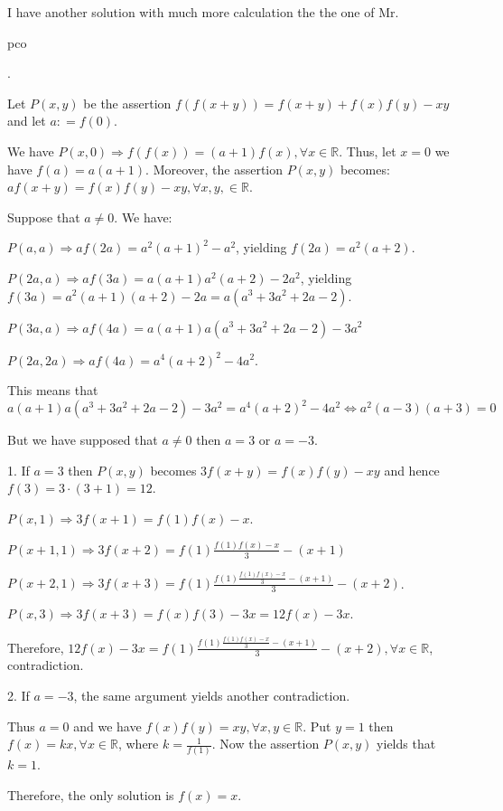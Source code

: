 \begin{solution}
	I have another solution with much more calculation the the one of Mr.\begin{bolded}pco\end{bolded}.

Let $ P(x,y)$ be the assertion $ f(f(x+y)) = f(x+y) + f(x)f(y) - xy$ and let $ a: =f(0)$.

We have $ P(x,0) \Rightarrow f(f(x)) = (a+1)f(x),\forall x\in\mathbb{R}$. Thus, let $ x=0$ we have $ f(a) = a(a+1)$. Moreover, the assertion $ P(x,y)$ becomes: $ af(x+y) = f(x)f(y) - xy,\forall x,y,\in\mathbb{R}$.

Suppose that $ a\neq 0$. We have:

$ P(a,a) \Rightarrow af(2a) = a^2(a+1)^2 - a^2$, yielding $ f(2a) = a^2(a+2)$.

$ P(2a,a) \Rightarrow af(3a) = a(a+1)a^2(a+2) - 2a^2$, yielding $ f(3a) = a^2(a+1)(a+2) - 2a = a(a^3 + 3a^2 + 2a -2)$.

$ P(3a,a) \Rightarrow af(4a) = a(a+1)a(a^3 + 3a^2 + 2a -2) - 3a^2$

$ P(2a,2a) \Rightarrow af(4a) = a^4(a+2)^2 - 4a^2$.

This means that $ a(a+1)a(a^3 + 3a^2 + 2a -2) - 3a^2 = a^4(a+2)^2 - 4a^2\Leftrightarrow a^2(a-3)(a+3) = 0$

But we have supposed that $ a\neq 0$ then $ a=3$ or $ a=-3$.

1. If $ a=3$ then $ P(x,y)$ becomes $ 3f(x+y) = f(x)f(y) - xy$ and hence $ f(3) = 3\cdot (3+1) = 12$.

$ P(x,1) \Rightarrow 3f(x+1) = f(1)f(x) - x$.

$ P(x+1,1) \Rightarrow 3f(x+2) = f(1)\frac{f(1)f(x) - x}{3} - (x+1)$

$ P(x+2,1) \Rightarrow 3f(x+3) = f(1)\frac{f(1)\frac{f(1)f(x) - x}{3} - (x+1)}{3} - (x+2)$.

$ P(x,3) \Rightarrow 3f(x+3) = f(x)f(3) - 3x = 12f(x) - 3x$.

Therefore, $ 12f(x) - 3x = f(1)\frac{f(1)\frac{f(1)f(x) - x}{3} - (x+1)}{3} - (x+2),\forall x\in\mathbb{R}$, contradiction.

2. If $ a= -3$, the same argument yields another contradiction.

Thus $ a=0$ and we have $ f(x)f(y) = xy,\forall x,y\in\mathbb{R}$. Put $ y=1$ then $ f(x) = kx,\forall x\in\mathbb{R}$, where $ k=\frac{1}{f(1)}$. Now the assertion $ P(x,y)$ yields that $ k=1$.

Therefore, the only solution is $ f(x) = x$.
\end{solution}



